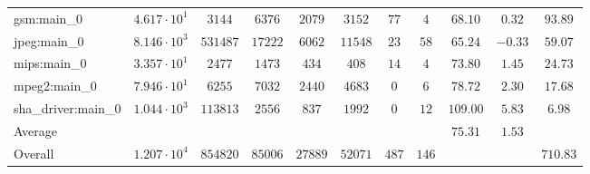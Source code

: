 \begin{tabular}{|l|c|c|c|c|c|c|c|c|c|c|}
gsm:main\_0             & $ 4.617 \cdot 10^{1} $ & $ 3144   $ & $ 6376  $ & $ 2079  $ & $ 3152  $ & $ 77  $ & $ 4   $ & $ 68.10       $ & $ 0.32    $ & $ 93.89   $ \\
jpeg:main\_0            & $ 8.146 \cdot 10^{3} $ & $ 531487 $ & $ 17222 $ & $ 6062  $ & $ 11548 $ & $ 23  $ & $ 58  $ & $ 65.24       $ & $ -0.33   $ & $ 59.07   $ \\
mips:main\_0            & $ 3.357 \cdot 10^{1} $ & $ 2477   $ & $ 1473  $ & $ 434   $ & $ 408   $ & $ 14  $ & $ 4   $ & $ 73.80       $ & $ 1.45    $ & $ 24.73   $ \\
mpeg2:main\_0           & $ 7.946 \cdot 10^{1} $ & $ 6255   $ & $ 7032  $ & $ 2440  $ & $ 4683  $ & $ 0   $ & $ 6   $ & $ 78.72       $ & $ 2.30    $ & $ 17.68   $ \\
sha\_driver:main\_0     & $ 1.044 \cdot 10^{3} $ & $ 113813 $ & $ 2556  $ & $ 837   $ & $ 1992  $ & $ 0   $ & $ 12  $ & $ 109.00      $ & $ 5.83    $ & $ 6.98    $ \\
\hline
Average                 & $                    $ & $        $ & $       $ & $       $ & $       $ & $     $ & $     $ & $ 75.31       $ & $ 1.53    $ & $         $ \\
\hline
Overall                 & $ 1.207 \cdot 10^{4} $ & $ 854820 $ & $ 85006 $ & $ 27889 $ & $ 52071 $ & $ 487 $ & $ 146 $ & $             $ & $         $ & $ 710.83  $ \\
\hline
\end{tabular}
